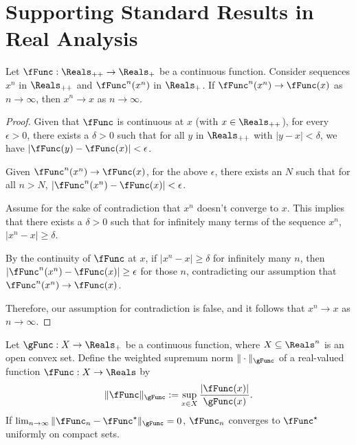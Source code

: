 \documentclass[\econtexRoot/BufferStockTheory]{subfiles}
\begin{document}
\section{Supporting Standard Results in Real Analysis}\label{sec:realanalysis}


\begin{proposition}\label{prop:xnconvgf}
Let $\fFunc: \Reals_{++} \to \Reals_{+}$ be a continuous function. Consider sequences $x^{n}$ in $\Reals_{++}$ and $\fFunc^n(x^{n})$ in $\Reals_{+}$. If $\fFunc^{n}(x^{n}) \to \fFunc(x)$ as $n \to \infty$, then $x^{n} \to x$ as $n \to \infty$.
\end{proposition}

\begin{proof}
Given that $\fFunc$ is continuous at $x$ (with $x \in \Reals_{++}$), for every $\epsilon > 0$, there exists a $\delta > 0$ such that for all $y$ in $\Reals_{++}$ with $\vert y - x\vert < \delta$, we have $\vert \fFunc(y) - \fFunc(x)\vert  < \epsilon$.

Given $\fFunc^{n}(x^{n}) \to \fFunc(x)$, for the above $\epsilon$, there exists an $N$ such that for all $n > N$, $\vert \fFunc^{n}(x^{n}) - \fFunc(x)\vert < \epsilon$.

Assume for the sake of contradiction that $x^{n}$ doesn't converge to $x$.
This implies that there exists a $\delta > 0$ such that for infinitely many terms of the sequence $x^{n}$, $\vert x^{n} - x\vert  \geq \delta$.

By the continuity of $\fFunc$ at $x$, if $\vert x^{n} - x\vert  \geq \delta$ for infinitely many $n$, then $\vert \fFunc^{n}(x^{n}) - \fFunc(x)\vert  \geq \epsilon$ for those $n$, contradicting our assumption that $\fFunc^{n}(x^{n}) \to \fFunc(x)$.

Therefore, our assumption for contradiction is false, and it follows that $x^{n} \to x$ as $n \to \infty$.
\end{proof}

\begin{fact}
Let $\gFunc: X \to \Reals_{+}$ be a continuous function, where $X \subseteq \Reals^{n}$ is an open convex set. Define the weighted supremum norm $\Vert\cdot \Vert_{\gFunc}$ of a real-valued function $\fFunc: X \to \Reals$ by
\begin{equation}
\Vert \fFunc \Vert_\gFunc := \sup_{x \in X} \frac{\vert \fFunc(x)\vert }{\gFunc(x)}.
\end{equation}
If $\lim_{n \to \infty} \Vert \fFunc_n - \fFunc^{\star} \Vert_\gFunc = 0$, $\fFunc_n$ converges to $\fFunc^{\star}$ uniformly on compact sets.
\end{fact}
\end{document}
